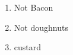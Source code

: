 \documentclass{article}
\begin{document}
\begin{enumerate}
    \item Not Bacon
    \item Not doughnuts
    \item custard
\end{enumerate}
\end{document}
